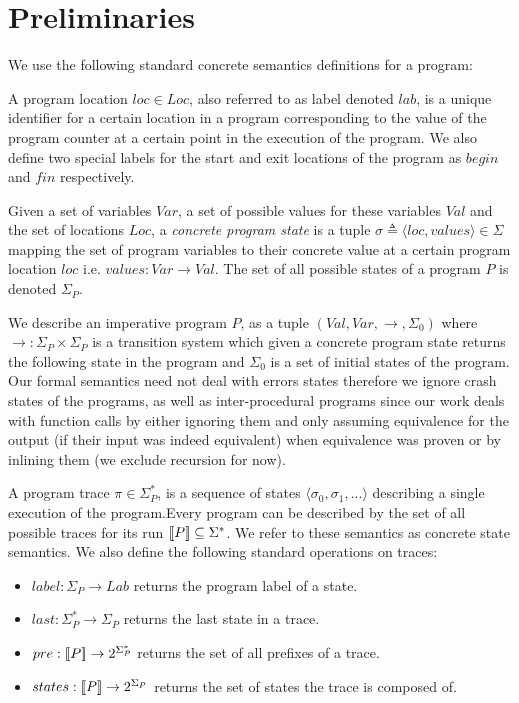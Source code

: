 \section{Preliminaries} 
We use the following standard concrete semantics definitions for a program:

A program location $loc \in Loc$, also referred to as label denoted $lab$, is a unique identifier for a certain location in a program corresponding to the value of the program counter at a certain point in the execution of the program. We also define two special labels for the start and exit locations of the program as $begin$ and $fin$ respectively.

Given a set of variables $Var$, a set of possible values for these variables $Val$ and the set of locations $Loc$, a \emph{concrete program state} is a tuple $\sigma \triangleq \langle loc, values \rangle \in \Sigma$ mapping the set of program variables to their concrete value at a certain program location $loc$ i.e. $values : Var \rightarrow Val$. The set of all possible states of a program $P$ is denoted $\Sigma_{P}$.

\begin{sloppypar}
We describe an imperative program $P$, as a tuple $(Val,Var,\rightarrow,\Sigma_{0})$ where $\rightarrow : \Sigma_{P} \times \Sigma_{P} $  is a transition system which given a concrete program state returns the following state in the program and $\Sigma_{0}$ is a set of initial states of the program. Our formal semantics need not deal with errors states therefore we ignore crash states of the programs, as well as inter-procedural programs since our work deals with function calls by either ignoring them and only assuming equivalence for the output (if their input was indeed equivalent) when equivalence was proven or by inlining them (we exclude recursion for now).
\end{sloppypar}

A program trace $\pi \in \Sigma^*_{P}$, is a sequence of states $\langle \sigma_0,\sigma_1,... \rangle$ describing a single execution of the program.Every program can be described by the set of all possible traces for its run $\lbrack\!\lbrack P \rbrack\!\rbrack \subseteq \Sigma^*$. We refer to these semantics as concrete state semantics. We also define the following standard operations on traces:
\begin{itemize}
\item $label : \Sigma_{P} \rightarrow Lab$ returns the program label of a state.
\item $last : \Sigma_{P}^* \rightarrow \Sigma_{P}$ returns the last state in a trace.
\item $pre : \lbrack\!\lbrack P \rbrack\!\rbrack \rightarrow 2^{\Sigma_{P}^*}$ returns the set of all prefixes of a trace.
\item $states : \lbrack\!\lbrack P \rbrack\!\rbrack \rightarrow 2^{\Sigma_{P}}$ returns the set of states the trace is composed of.
\end{itemize}


